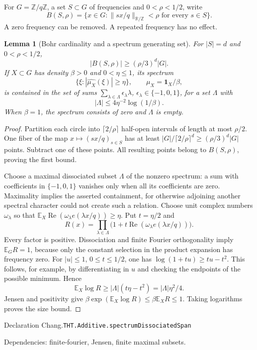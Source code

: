 \documentclass[11pt]{article}
\newtheorem{lemma}[theorem]{Lemma}
\theoremstyle{definition}
\newcommand{\R}{\mathbb R}
\newcommand{\Z}{\mathbb Z}
\newcommand{\E}{\mathbb E}
\newcommand{\one}{\mathbf 1}
\numberwithin{equation}{section}
\newcommand{\bp}[3]{\par\smallskip\begingroup\footnotesize
\noindent\hypertarget{bp:#1}{\textsf{Declaration #1.}}\quad\nolinkurl{#2}\par
\noindent\textsf{Dependencies:} #3.\par\endgroup\smallskip}
\begin{document}
For $G=\Z/q\Z$, a set $S\subset G$ of frequencies and $0<\rho<1/2$, write
\[
 B(S,\rho)=\{x\in G:\|sx/q\|_{\R/\Z}<\rho\text{ for every }s\in S\}.
\]
A zero frequency can be removed. A repeated frequency has no effect.

\begin{lemma}[Bohr cardinality and a spectrum generating set]\label{lem:Chang}
For $|S|=d$ and $0<\rho<1/2$,
\[
 |B(S,\rho)|\ge(\rho/3)^d|G|.
\]
If $X\subset G$ has density $\beta>0$ and $0<\eta\le1$, its spectrum
\[
 \{\xi:|\widehat{\mu_X}(\xi)|\ge\eta\},\qquad \mu_X=\one_X/\beta,
\]
is contained in the set of sums $\sum_{\lambda\in\Lambda}\epsilon_\lambda\lambda$, $\epsilon_\lambda\in\{-1,0,1\}$, for a set $\Lambda$ with
\[
 |\Lambda|\le 4\eta^{-2}\log(1/\beta).
\]
When $\beta=1$, the spectrum consists of zero and $\Lambda$ is empty.
\end{lemma}
\begin{proof}
Partition each circle into $\lceil2/\rho\rceil$ half-open intervals of length at most $\rho/2$. One fiber of the map $x\mapsto(sx/q)_{s\in S}$ has at least $|G|/\lceil2/\rho\rceil^d\ge(\rho/3)^d|G|$ points. Subtract one of these points. All resulting points belong to $B(S,\rho)$, proving the first bound.

Choose a maximal dissociated subset $\Lambda$ of the nonzero spectrum: a sum with coefficients in $\{-1,0,1\}$ vanishes only when all its coefficients are zero. Maximality implies the asserted containment, for otherwise adjoining another spectral character could not create such a relation. Choose unit complex numbers $\omega_\lambda$ so that $\E_X\operatorname{Re}(\omega_\lambda e(\lambda x/q))\ge\eta$. Put $t=\eta/2$ and
\[
 R(x)=\prod_{\lambda\in\Lambda}\bigl(1+t\operatorname{Re}(\omega_\lambda e(\lambda x/q))\bigr).
\]
Every factor is positive. Dissociation and finite Fourier orthogonality imply $\E_G R=1$, because only the constant selection in the product expansion has frequency zero. For $|u|\le1$, $0\le t\le1/2$, one has $\log(1+tu)\ge tu-t^2$. This follows, for example, by differentiating in $u$ and checking the endpoints of the possible minimum. Hence
\[
 \E_X\log R\ge |\Lambda|(t\eta-t^2)=|\Lambda|\eta^2/4.
\]
Jensen and positivity give $\beta\exp(\E_X\log R)\le\beta\E_XR\le1$. Taking logarithms proves the size bound.
\end{proof}
\bp{Chang}{THT.Additive.spectrumDissociatedSpan}{finite-fourier, Jensen, finite maximal subsets}
\end{document}
